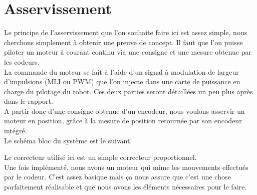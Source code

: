 \section{Asservissement}
Le principe de l'asservissement que l'on souhaite faire ici est assez simple, nous cherchons simplement à obtenir une preuve de concept. Il faut que l'on puisse piloter un moteur à courant continu via une consigne et une mesure obtenue par les codeurs.\\

La commande du moteur se fait à l'aide d'un signal à modulation de largeur d'impulsions (MLI ou PWM) que l'on injecte dans une carte de puissance en charge du pilotage du robot. Ces deux parties seront détaillées un peu plus après dans le rapport.\\

A partir donc d'une consigne obtenue d'un encodeur, nous voulons asservir un moteur en position, gr\^ace à la mesure de position retournée par son encodeur intégré.\\ Le schéma bloc du système est le suivant.\\

	\begin{center}
	\end{center}
		
	Le correcteur utilisé ici est un simple correcteur proportionnel.\\
	Une fois implémenté, nous avons un moteur qui mime les mouvements effectués par le codeur. C'est assez basique mais ça nous assure que c'est une chose parfaitement réalisable et que nous avons les éléments nécessaires pour le faire.\\
		
